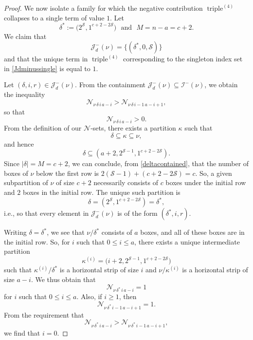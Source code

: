 \documentclass[12pt]{article}
\begin{document}
\begin{proof}
 We now isolate a family for which the negative contribution 
\(\operatorname{triple}^{(4)}\) collapses to a single term of value \(1\). Let 
 $$ \delta^{\ast} := \big( 2^{\mathcal{S}}, 1^{c+2-2\mathcal{S}} \big) \ \ \ \text{and} 
 \ \ \ M = n - a = c + 2. $$
 We claim that 
\begin{equation}\label{Jdminussingle}
 \mathcal{J}_{d}^{-}(\nu) = \big\{ (\delta^{\ast}, 0, \mathcal{S} ) \big\} 
\end{equation}
 and that the unique term in $\operatorname{triple}^{(4)}$ corresponding to the singleton index set in \eqref{Jdminussingle} is 
 equal to $1$. 

 Let $(\delta, i, r) \in \mathcal{J}_{d}^{-}(\nu)$. From the containment $\mathcal{J}_{d}^{-}(\nu) \subseteq \mathcal{I}^{-}(\nu)$, we obtain 
 the inequality $$ \mathcal{N}_{\nu \, \delta \, i \, a - i} > \mathcal{N}_{\nu \, \delta \, i - 1 \, a - i + 1}, $$ so that $$ \mathcal{N}_{\nu 
 \, \delta \, i \, a - i} > 0. $$ From the definition of our $\mathcal{N}$-sets, there exists a partition $\kappa$ such that $$ \delta \subseteq 
 \kappa \subseteq \nu, $$ and hence 
\begin{equation}\label{deltacontained}
 \delta \subseteq (a+2, 2^{\mathcal{S}-1}, 1^{c+2-2\mathcal{S}}).
\end{equation}
 Since $|\delta| = M = c + 2$, we can conclude, from \eqref{deltacontained}, that the number of boxes of $\nu$ below the first row is
 $2 (\mathcal{S}-1) + (c + 2 - 2 \mathcal{S}) =c$. So, a given subpartition of $\nu$ of size $c+2$ necessarily consists of $c$ boxes
 under the initial row and $2$ boxes in the initial row. The unique such partition is $$ \delta = (2^\mathcal{S}, 1^{c + 2 - 
 2\mathcal{S}}) = \delta^{\ast}, $$ i.e., so that every element in $\mathcal{J}_{d}^{-}(\nu)$ is of the form $(\delta^{\ast}, i, r)$.
 
 Writing $\delta = \delta^{\ast}$, we see that $ \nu / \delta^{\ast} $ consists of $a$ boxes, and all of these boxes are in the initial row. 
 So, for $i$ such that $0 \leq i \leq a$, there exists a unique intermediate partition $$ \kappa^{(i)} = \big( i + 2, 2^{\mathcal{S}-1}, 
 1^{c + 2 - 2 \mathcal{S}} \big) $$ such that $\kappa^{(i)} / \delta^{\ast}$ is a horizontal strip of size $i$ and $\nu / \kappa^{(i)}$ is a 
 horizontal strip of size $a - i$. We thus obtain that $$ \mathcal{N}_{\nu \, \delta^{\ast} \, i \, a - i} = 1 $$ for $i$ such that $0 \leq i \leq 
 a$. Also, if $i \geq 1$, then $$ \mathcal{N}_{\nu \, \delta^{\ast} \, i - 1 \, a - i + 1 } = 1.$$ From the requirement that $$ \mathcal{N}_{\nu 
 \, \delta^{\ast} \, i \, a - i } > \mathcal{N}_{\nu \, \delta^{\ast} \, i - 1 \, a - i +1}, $$ we find that $ i = 0$. 


\end{proof}
\end{document}
